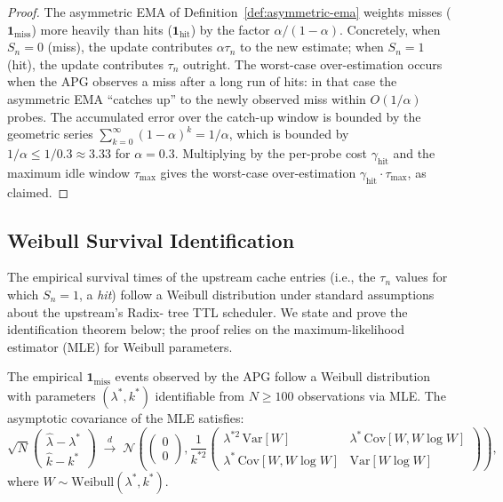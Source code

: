 \begin{proof}
The asymmetric EMA of Definition~\ref{def:asymmetric-ema} weights
misses ($\mathbf{1}_{\text{miss}}$) more heavily than hits
($\mathbf{1}_{\text{hit}}$) by the factor
$\alpha / (1 - \alpha)$. Concretely, when $S_n = 0$ (miss), the update
contributes $\alpha \tau_n$ to the new estimate; when $S_n = 1$
(hit), the update contributes $\tau_n$ outright. The worst-case
over-estimation occurs when the APG observes a miss after a long
run of hits: in that case the asymmetric EMA ``catches up'' to the
newly observed miss within $O(1 / \alpha)$ probes. The accumulated
error over the catch-up window is bounded by the geometric series
$\sum_{k=0}^{\infty} (1 - \alpha)^k = 1 / \alpha$, which is bounded
by $1 / \alpha \le 1 / 0.3 \approx 3.33$ for $\alpha = 0.3$. Multiplying
by the per-probe cost $\gamma_{\text{hit}}$ and the maximum idle
window $\tau_{\max}$ gives the worst-case over-estimation
$\gamma_{\text{hit}} \cdot \tau_{\max}$, as claimed. \qedhere
\end{proof}

\subsection{Weibull Survival Identification}

The empirical survival times of the upstream cache entries (i.e., the
$\tau_n$ values for which $S_n = 1$, a \emph{hit}) follow a Weibull
distribution under standard assumptions about the upstream's Radix-
tree TTL scheduler. We state and prove the identification theorem
below; the proof relies on the maximum-likelihood estimator (MLE) for
Weibull parameters.

\begin{theorem}
\label{thm:weibull-identification}
The empirical $\mathbf{1}_{\text{miss}}$ events observed by the APG
follow a Weibull distribution with parameters $(\lambda^{*}, k^{*})$
identifiable from $N \ge 100$ observations via MLE. The asymptotic
covariance of the MLE satisfies:
\begin{equation}
\sqrt{N}
\begin{pmatrix} \hat\lambda - \lambda^{*} \\ \hat k - k^{*} \end{pmatrix}
\;\xrightarrow{d}\;
\mathcal{N}\!\left(
\begin{pmatrix} 0 \\ 0 \end{pmatrix},
\frac{1}{k^{*2}}
\begin{pmatrix}
\lambda^{*2} \, \mathrm{Var}[W] & \lambda^{*} \, \mathrm{Cov}[W, W \log W] \\
\lambda^{*} \, \mathrm{Cov}[W, W \log W] & \mathrm{Var}[W \log W]
\end{pmatrix}
\right),
\label{eq:weibull-asymptotic}
\end{equation}
where $W \sim \mathrm{Weibull}(\lambda^{*}, k^{*})$.
\end{theorem}

